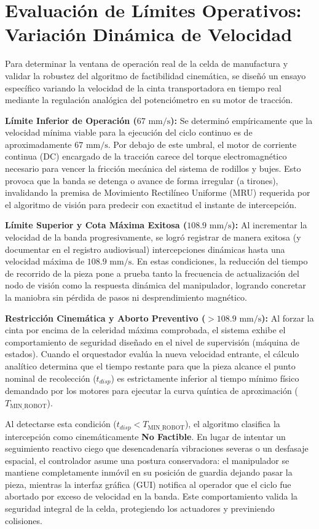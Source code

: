 \documentclass[12pt, a4paper]{report}
\begin{document}
\section{Evaluación de Límites Operativos: Variación Dinámica de Velocidad}
Para determinar la ventana de operación real de la celda de manufactura y validar la robustez del algoritmo de factibilidad cinemática, se diseñó un ensayo específico variando la velocidad de la cinta transportadora en tiempo real mediante la regulación analógica del potenciómetro en su motor de tracción.

\textbf{Límite Inferior de Operación ($67\text{ mm/s}$):} 
Se determinó empíricamente que la velocidad mínima viable para la ejecución del ciclo continuo es de aproximadamente $67\text{ mm/s}$. Por debajo de este umbral, el motor de corriente continua (DC) encargado de la tracción carece del torque electromagnético necesario para vencer la fricción mecánica del sistema de rodillos y bujes. Esto provoca que la banda se detenga o avance de forma irregular (a tirones), invalidando la premisa de Movimiento Rectilíneo Uniforme (MRU) requerida por el algoritmo de visión para predecir con exactitud el instante de intercepción.

\textbf{Límite Superior y Cota Máxima Exitosa ($108.9\text{ mm/s}$):}
Al incrementar la velocidad de la banda progresivamente, se logró registrar de manera exitosa (y documentar en el registro audiovisual) intercepciones dinámicas hasta una velocidad máxima de $108.9\text{ mm/s}$. En estas condiciones, la reducción del tiempo de recorrido de la pieza pone a prueba tanto la frecuencia de actualización del nodo de visión como la respuesta dinámica del manipulador, logrando concretar la maniobra sin pérdida de pasos ni desprendimiento magnético.

\textbf{Restricción Cinemática y Aborto Preventivo ($> 108.9\text{ mm/s}$):}
Al forzar la cinta por encima de la celeridad máxima comprobada, el sistema exhibe el comportamiento de seguridad diseñado en el nivel de supervisión (máquina de estados). Cuando el orquestador evalúa la nueva velocidad entrante, el cálculo analítico determina que el tiempo restante para que la pieza alcance el punto nominal de recolección ($t_{disp}$) es estrictamente inferior al tiempo mínimo físico demandado por los motores para ejecutar la curva quíntica de aproximación ($T_{\text{MIN\_ROBOT}}$). 

Al detectarse esta condición ($t_{disp} < T_{\text{MIN\_ROBOT}}$), el algoritmo clasifica la intercepción como cinemáticamente \textbf{No Factible}. En lugar de intentar un seguimiento reactivo ciego que desencadenaría vibraciones severas o un desfasaje espacial, el controlador asume una postura conservadora: el manipulador se mantiene completamente inmóvil en su posición de guardia dejando pasar la pieza, mientras la interfaz gráfica (GUI) notifica al operador que el ciclo fue abortado por exceso de velocidad en la banda. Este comportamiento valida la seguridad integral de la celda, protegiendo los actuadores y previniendo colisiones.
\end{document}
